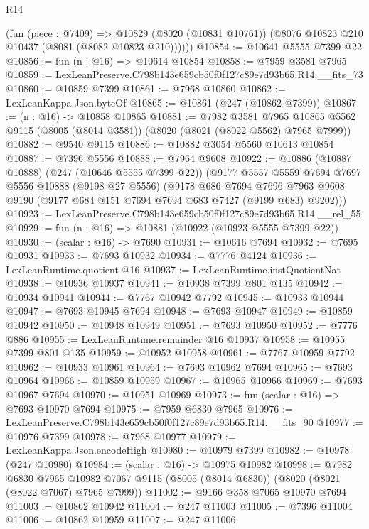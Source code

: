 \begin{lexlean}{R14}
\begin{coremodule}
        (fun (piece : @7409) =>
        @10829 (@8020 (@10831 @10761)) (@8076 @10823 @210 @10437 (@8081 (@8082 @10823 @210))))))
@10854 := @10641 @5555 @7399 @22
@10856 := fun (n : @16) => @10614 @10854
@10858 := @7959 @3581 @7965
@10859 := LexLeanPreserve.C798b143e659cb50f0f127c89e7d93b65.R14.__fits_73
@10860 := @10859 @7399
@10861 := @7968 @10860
@10862 := LexLeanKappa.Json.byteOf
@10865 := @10861 (@247 (@10862 @7399))
@10867 := (n : @16) -> @10858 @10865
@10881 := @7982
    @3581
    @7965
    @10865
    @5562
    @9115
    (@8005 (@8014 @3581))
    (@8020 (@8021 (@8022 @5562) @7965 @7999))
@10882 := @9540 @9115
@10886 := @10882 @3054 @5560 @10613 @10854
@10887 := @7396 @5556
@10888 := @7964 @9608
@10922 := @10886
    (@10887 @10888)
    (@247 (@10646 @5555 @7399 @22))
    (@9177
      @5557
      @5559
      @7694
      @7697
      @5556
      @10888
      (@9198 @27 @5556)
      (@9178
        @686
        @7694
        @7696
        @7963
        @9608
        @9190
        (@9177 @684 @151 @7694 @7694 @683 @7427 (@9199 @683) @9202)))
@10923 := LexLeanPreserve.C798b143e659cb50f0f127c89e7d93b65.R14.__rel_55
@10929 := fun (n : @16) => @10881 (@10922 (@10923 @5555 @7399 @22))
@10930 := (scalar : @16) -> @7690
@10931 := @10616 @7694
@10932 := @7695 @10931
@10933 := @7693 @10932
@10934 := @7776 @4124
@10936 := LexLeanRuntime.quotient @16
@10937 := LexLeanRuntime.instQuotientNat
@10938 := @10936 @10937
@10941 := @10938 @7399 @801 @135
@10942 := @10934 @10941
@10944 := @7767 @10942 @7792
@10945 := @10933 @10944
@10947 := @7693 @10945 @7694
@10948 := @7693 @10947
@10949 := @10859 @10942
@10950 := @10948 @10949
@10951 := @7693 @10950
@10952 := @7776 @886
@10955 := LexLeanRuntime.remainder @16 @10937
@10958 := @10955 @7399 @801 @135
@10959 := @10952 @10958
@10961 := @7767 @10959 @7792
@10962 := @10933 @10961
@10964 := @7693 @10962 @7694
@10965 := @7693 @10964
@10966 := @10859 @10959
@10967 := @10965 @10966
@10969 := @7693 @10967 @7694
@10970 := @10951 @10969
@10973 := fun (scalar : @16) => @7693 @10970 @7694
@10975 := @7959 @6830 @7965
@10976 := LexLeanPreserve.C798b143e659cb50f0f127c89e7d93b65.R14.__fits_90
@10977 := @10976 @7399
@10978 := @7968 @10977
@10979 := LexLeanKappa.Json.encodeHigh
@10980 := @10979 @7399
@10982 := @10978 (@247 @10980)
@10984 := (scalar : @16) -> @10975 @10982
@10998 := @7982
    @6830
    @7965
    @10982
    @7067
    @9115
    (@8005 (@8014 @6830))
    (@8020 (@8021 (@8022 @7067) @7965 @7999))
@11002 := @9166 @358 @7065 @10970 @7694
@11003 := @10862 @10942
@11004 := @247 @11003
@11005 := @7396 @11004
@11006 := @10862 @10959
@11007 := @247 @11006

\end{coremodule}
\end{lexlean}

